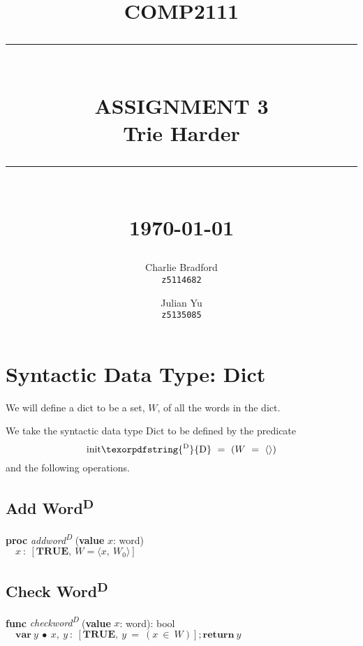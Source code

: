 \documentclass[a4paper, fleqn]{article}
\newcommand{\D}{\texorpdfstring{\textsuperscript{D}}{D}}
\begin{document}
\title{ \normalsize \textsc{COMP2111}
        \\ [2.0cm]
		\rule{\linewidth}{0.5pt} \\
        \LARGE \textbf{\uppercase{Assignment 3} \\
		\normalsize Trie Harder}
		\rule{\linewidth}{2pt} \\ [0.5cm]
        \normalsize \today \vspace*{5\baselineskip}}

\date{}
\author{Charlie Bradford \\
		\texttt{z5114682}
		\and
		Julian Yu \\
		\texttt{z5135085}
		}


\vspace{2 in}
\maketitle

\tableofcontents


\clearpage\section{Syntactic Data Type: Dict}
We will define a dict to be a set, $W$, of all the words in the dict.

We take the syntactic data type Dict to be defined by the predicate 
$$\text{init\D}\ =\ (W\ =\ \langle\rangle)$$
and the following operations.


\subsection{Add Word\D}
\hspace*{10mm}\textbf{proc} \textit{addword\D} (\textbf{value} $x$: word) \\
\hspace*{20mm}$\quad x\ :\ [\textbf{TRUE},\ W = \langle x,\ W_0 \rangle]$ 

\subsection{Check Word\D}
\hspace*{10mm}\textbf{func} \textit{checkword\D} (\textbf{value} $x$: word): bool \\
\hspace*{20mm}$\quad \textbf{var}\ y\ \bullet\ x,\ y\ :\ [\textbf{TRUE},\ y\ =\ (x\ \in\ W)]; \textbf{return}\ y$
\end{document}
